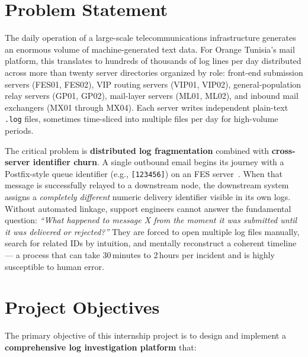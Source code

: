 \documentclass[12pt,a4paper,oneside]{report}
\begin{document}
\section*{Problem Statement}
{}

The daily operation of a large-scale telecommunications infrastructure generates an enormous volume of machine-generated text data.
For Orange Tunisia's mail platform, this translates to hundreds of thousands of log lines per day distributed across more than twenty server directories organized by role:
front-end submission servers (FES01, FES02), VIP routing servers (VIP01, VIP02), general-population relay servers (GP01, GP02), mail-layer servers (ML01, ML02), and inbound mail exchangers (MX01 through MX04).
Each server writes independent plain-text \texttt{.log} files, sometimes time-sliced into multiple files per day for high-volume periods.

The critical problem is \textbf{distributed log fragmentation} combined with \textbf{cross-server identifier churn}.
A single outbound email begins its journey with a Postfix-style queue identifier (e.g., \texttt{[123456]}) on an FES server~\cite{postfixDocs}.
When that message is successfully relayed to a downstream node, the downstream system assigns a \emph{completely different} numeric delivery identifier visible in its own logs.
Without automated linkage, support engineers cannot answer the fundamental question:
\emph{``What happened to message X from the moment it was submitted until it was delivered or rejected?''}
They are forced to open multiple log files manually, search for related IDs by intuition, and mentally reconstruct a coherent timeline --- a process that can take 30\,minutes to 2\,hours per incident and is highly susceptible to human error.

\section*{Project Objectives}
{}

The primary objective of this internship project is to design and implement a \textbf{comprehensive log investigation platform} that:
\end{document}
